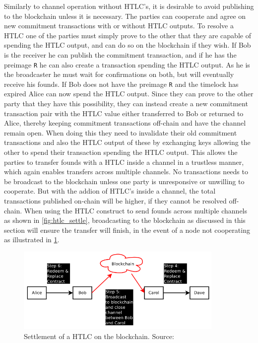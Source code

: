Similarly to channel operation without HTLC's, it is desirable to avoid publishing to the blockchain unless it is necessary. The parties can cooperate and agree on new commitment transactions with or without HTLC outputs. To resolve a HTLC one of the parties must simply prove to the other that they are capable of spending the HTLC output, and can do so on the blockchain if they wish. If Bob is the receiver he can publish the commitment transaction, and if he has the preimage {\tt R} he can also create a transaction spending the HTLC output. As he is the broadcaster he must wait for confirmations on both, but will eventually receive his founds. If Bob does not have the preimage {\tt R} and the timelock has expired Alice can now spend the HTLC output. Since they can prove to the other party that they have this possibility, they can instead create a new commitment transaction pair with the HTLC value either transferred to Bob or returned to Alice, thereby keeping  commitment transactions off-chain and have the channel remain open. When doing this they need to invalidate their old commitment transactions and also the HTLC output of these by exchanging keys allowing the other to spend their transaction spending the HTLC output. This allows the parties to transfer founds with a HTLC inside a channel in a trustless manner, which again enables transfers across multiple channels.
No transactions needs to be broadcast to the blockchain unless one party is unresponsive or unwilling to cooperate. But with the addion of HTLC's inside a channel, the total transactions published on-chain will be higher, if they cannot be resolved off-chain.
When using the HTLC construct to send founds across multiple channels as shown in \cref{fig:htlc_settle}, broadcasting to the blockchain as discussed in this section will ensure the transfer will finish, in the event of a node not cooperating as illustrated in \cref{fig:htlc_bc}.

\begin{figure}[ht]
    \centering
    \includegraphics[width=10cm]{figures/htlc_bc.png}
    \caption{Settlement of a HTLC on the blockchain. Source:~\cite{poon2015bitcoin}}
    \label{fig:htlc_bc}
\end{figure}

